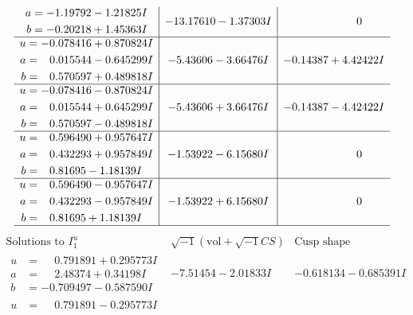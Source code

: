 \documentclass[1p]{elsarticle_modified}
\theoremstyle{definition}
\newcommand{\I}{\sqrt{-1}}
\begin{document}
$$\begin{array}{c|c|c}
\begin{aligned}
a &= -1.19792 - 1.21825 I \\
b &= -0.20218 + 1.45363 I\end{aligned}
 & -13.17610 - 1.37303 I & \phantom{-0.000000 } 0 \\ \hline\begin{aligned}
u &= -0.078416 + 0.870824 I \\
a &= \phantom{-}0.015544 - 0.645299 I \\
b &= \phantom{-}0.570597 + 0.489818 I\end{aligned}
 & -5.43606 - 3.66476 I & -0.14387 + 4.42422 I \\ \hline\begin{aligned}
u &= -0.078416 - 0.870824 I \\
a &= \phantom{-}0.015544 + 0.645299 I \\
b &= \phantom{-}0.570597 - 0.489818 I\end{aligned}
 & -5.43606 + 3.66476 I & -0.14387 - 4.42422 I \\ \hline\begin{aligned}
u &= \phantom{-}0.596490 + 0.957647 I \\
a &= \phantom{-}0.432293 + 0.957849 I \\
b &= \phantom{-}0.81695 - 1.18139 I\end{aligned}
 & -1.53922 - 6.15680 I & \phantom{-0.000000 } 0 \\ \hline\begin{aligned}
u &= \phantom{-}0.596490 - 0.957647 I \\
a &= \phantom{-}0.432293 - 0.957849 I \\
b &= \phantom{-}0.81695 + 1.18139 I\end{aligned}
 & -1.53922 + 6.15680 I & \phantom{-0.000000 } 0\\
 \hline 
 \end{array}$$\newpage$$\begin{array}{c|c|c}  
\text{Solutions to }I^u_{1}& \I (\text{vol} + \sqrt{-1}CS) & \text{Cusp shape}\\
 \hline 
\begin{aligned}
u &= \phantom{-}0.791891 + 0.295773 I \\
a &= \phantom{-}2.48374 + 0.34198 I \\
b &= -0.709497 - 0.587590 I\end{aligned}
 & -7.51454 - 2.01833 I & -0.618134 - 0.685391 I \\ \hline\begin{aligned}
u &= \phantom{-}0.791891 - 0.295773 I \\

\end{aligned}
\end{array}$$
\end{document}
